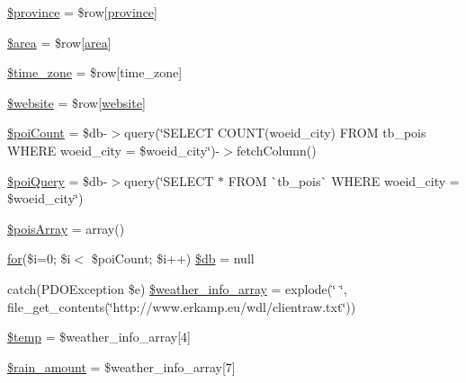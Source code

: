 \begin{DoxyCompactItemize}
\item 
\mbox{\hyperlink{rotterdam_2index_8php_a0bdd006d1becad76055fe31c887fdfaf}{\$province}} = \$row\mbox{[}\textquotesingle{}\mbox{\hyperlink{index_8php_a38d70414c65575df5643ad4296c9db2e}{province}}\textquotesingle{}\mbox{]}
\item 
\mbox{\hyperlink{rotterdam_2index_8php_a460a08379d150f8c151a07ad9a3251cd}{\$area}} = \$row\mbox{[}\textquotesingle{}\mbox{\hyperlink{index_8php_a5198216176428aa2303311f956213f33}{area}}\textquotesingle{}\mbox{]}
\item 
\mbox{\hyperlink{rotterdam_2index_8php_adce4610b55a895abff73b5ed259c4bd3}{\$time\+\_\+zone}} = \$row\mbox{[}\textquotesingle{}time\+\_\+zone\textquotesingle{}\mbox{]}
\item 
\mbox{\hyperlink{rotterdam_2index_8php_a2887d41d3bb2498db735eeb87efa2d73}{\$website}} = \$row\mbox{[}\textquotesingle{}\mbox{\hyperlink{index_8php_a8c56014cff17c1ced653aa98455da680}{website}}\textquotesingle{}\mbox{]}
\item 
\mbox{\hyperlink{rotterdam_2index_8php_a8fb5f82500861c51c8fcfd700321e59e}{\$poi\+Count}} = \$db-\/$>$query(\char`\"{}S\+E\+L\+E\+CT C\+O\+U\+NT(woeid\+\_\+city) F\+R\+OM tb\+\_\+pois W\+H\+E\+RE woeid\+\_\+city = \$woeid\+\_\+city\char`\"{})-\/$>$fetch\+Column()
\item 
\mbox{\hyperlink{rotterdam_2index_8php_a735d09bd88bab2d39b5d123b6a1ac7e9}{\$poi\+Query}} = \$db-\/$>$query(\char`\"{}S\+E\+L\+E\+CT $\ast$ F\+R\+OM \`{}tb\+\_\+pois\`{} W\+H\+E\+RE woeid\+\_\+city = \$woeid\+\_\+city\char`\"{})
\item 
\mbox{\hyperlink{rotterdam_2index_8php_aba22eb823924400ba310cca9821c67b3}{\$pois\+Array}} = array()
\item 
\mbox{\hyperlink{index_8php_a2e79af1ba492bd2cbbaafa83f16262da}{for}}(\$i=0; \$i$<$ \$poi\+Count; \$i++) \mbox{\hyperlink{rotterdam_2index_8php_ae26e87d17180fc87313d19b439092f0f}{\$db}} = null
\item 
catch(P\+D\+O\+Exception \$e) \mbox{\hyperlink{rotterdam_2index_8php_af16b636c83a2e1d4b020917a4fc5858b}{\$weather\+\_\+info\+\_\+array}} = explode(\char`\"{} \char`\"{}, file\+\_\+get\+\_\+contents(\char`\"{}http\+://www.\+erkamp.\+eu/wdl/clientraw.\+txt\char`\"{}))
\item 
\mbox{\hyperlink{rotterdam_2index_8php_a0d57fb0317e19ec798aa625381ebf342}{\$temp}} = \$weather\+\_\+info\+\_\+array\mbox{[}4\mbox{]}
\item 
\mbox{\hyperlink{rotterdam_2index_8php_a2aa7fd45b683a3c60b6f5e5d11a027b3}{\$rain\+\_\+amount}} = \$weather\+\_\+info\+\_\+array\mbox{[}7\mbox{]}

\end{DoxyCompactItemize}
